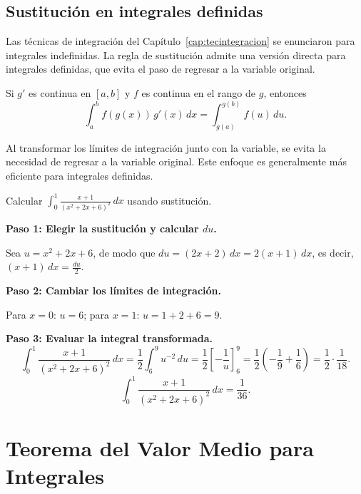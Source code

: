 \subsection{Sustitución en integrales definidas}

Las técnicas de integración del Capítulo~\ref{cap:tecintegracion} se
enunciaron para integrales indefinidas. La regla de sustitución admite una
versión directa para integrales definidas, que evita el paso de regresar a
la variable original.

\begin{theorem}
\label{thm:sustitucion-definida}
Si $g'$ es continua en $[a,b]$ y $f$ es continua en el rango de $g$,
entonces
\[
\int_a^b f(g(x))\, g'(x)\, dx = \int_{g(a)}^{g(b)} f(u)\, du.
\]
\end{theorem}

Al transformar los límites de integración junto con la variable, se evita
la necesidad de regresar a la variable original. Este enfoque es
generalmente más eficiente para integrales definidas.

\begin{example}
Calcular $\displaystyle\int_{0}^{1}\frac{x+1}{(x^2+2x+6)^2}\,dx$ usando sustitución.

\begin{myproof}

\textbf{Paso 1: Elegir la sustitución y calcular $du$.}

Sea $u = x^2 + 2x + 6$, de modo que $du = (2x+2)\,dx = 2(x+1)\,dx$, es decir, $(x+1)\,dx = \frac{du}{2}$.

\textbf{Paso 2: Cambiar los límites de integración.}

Para $x=0$: $u=6$; para $x=1$: $u = 1+2+6 = 9$.

\textbf{Paso 3: Evaluar la integral transformada.}
\[
\int_{0}^{1}\frac{x+1}{(x^2+2x+6)^2}\,dx
= \frac{1}{2}\int_{6}^{9} u^{-2}\,du
= \frac{1}{2}\left[-\frac{1}{u}\right]_6^9
= \frac{1}{2}\left(-\frac{1}{9}+\frac{1}{6}\right)
= \frac{1}{2}\cdot\frac{1}{18}.
\]
\[
\boxed{\int_{0}^{1}\frac{x+1}{(x^2+2x+6)^2}\,dx = \frac{1}{36}.}
\]
\end{myproof}
\end{example}

\section{Teorema del Valor Medio para Integrales}

